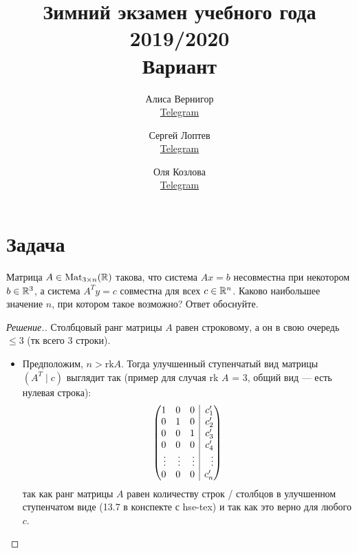\documentclass[a4paper]{article}
\title{Зимний экзамен учебного года 2019/2020\\Вариант \textnumero 1}
\author{	
    Алиса Вернигор       \\ \href{https://t.me/allisyonok}{Telegram} \and
	Сергей Лоптев        \\ \href{https://t.me/beast_sl}{Telegram} \and
	Оля Козлова        \\ \href{https://t.me/grenlayk}{Telegram}
}
\date{}
\makeatletter
\theoremstyle{remark}
\newenvironment{sysmatrix}[1]
{
    \left(\begin{array}{@{}#1@{}}
}
{\end{array}\right)}
\newcommand{\smt}[2]{\begin{sysmatrix}{#1} #2\end{sysmatrix}}
\makeatother
\begin{document}
	\maketitle
    \section*{Задача }

        Матрица $A \in \text{Mat}_{3 \times n}(\mathbb{R})$ такова, что система $Ax = b$ несовместна 
        при некотором $b \in \mathbb{R}^{3}$, а система $A^Ty = c$ совместна для всех $c \in \mathbb{R}^n$. 
        Каково наибольшее значение $n$, при котором такое возможно? Ответ обоснуйте. 
        \begin{proof}[Решение.]
            Столбцовый ранг матрицы $A$ равен строковому, а он в свою очередь $\leqslant 3$ 
            (тк всего 3 строки).

            \begin{itemize}
                \item Предположим, $n > \text{rk} A$. Тогда улучшенный ступенчатый вид матрицы 
                $(A^T \mid c)$ выглядит так (пример для случая rk $A$ = 3, общий вид --- 
                есть нулевая строка): 
                \[\smt{rrr|r} {
                    1 & 0 & 0 & c_1^{\prime} \\
                    0 & 1 & 0 & c_2^{\prime} \\
                    0 & 0 & 1 & c_3^{\prime} \\
                    0 & 0 & 0 & c_4^{\prime} \\
                    \vdots & \vdots & \vdots & \vdots\\
                    0 & 0 & 0 & c_n^{\prime}
                }\]
                так как ранг матрицы $A$ равен количеству строк / столбцов в улучшенном 
                ступенчатом виде (13.7 в конспекте с hse-tex) и так как это верно для любого $c$. 
                

\end{itemize}
\end{proof}
\end{document}
